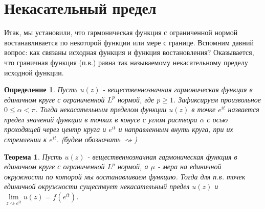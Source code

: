 \documentclass[12pt,a4paper]{article} %
\newtheorem{theorem}{Теорема}
\newtheorem{definition}{Определение}
\begin{document}
	\section{Некасательный предел}
	Итак, мы установили, что гармоническая функция с ограниченной нормой востанавливается по некоторой функции или мере с границе. Вспомним давний вопрос: как связаны исходная функция и функция востановления? Оказывается, что граничная функция (п.в.) равна так называемому некасательному пределу исходной функции.
	\begin{definition}
		Пусть $u(z)$ - вещественнозначная гармоническая функция в единичном круге с ограниченной $L^p$ нормой, где $p\geq1$. Зафиксируем произвольное $0\leq\alpha<\pi$. Тогда некасательным пределом функции $u(z)$ в точке $e^{it}$ назвается предел значений функции в точках в конусе с углом раствора $\alpha$ с осью проходящей через центр круга и $e^{it}$ и направленным внуть круга, при их стремлении к $e^{it}$. (будем обозначать $\rightsquigarrow$)
	\end{definition}
	\begin{theorem}
		Пусть $u(z)$ - вещественнозначная гармоническая функция в единичном круге с ограниченной $L^p$ нормой, а $\mu$ - мера на единичной окружности по которой мы востанавливаем функцию. Тогда для п.в. точек единичной окружности существует некасательный предел $u(z)$ и $\lim\limits_{z\rightsquigarrow e^{it}}u(z)=f(e^{it})$.
	\end{theorem}
\end{document}
